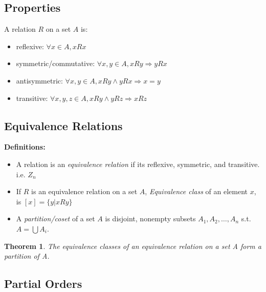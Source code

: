 \documentclass[10pt]{article}
\newcounter{set}
\newcommand{\Ra}{\Rightarrow}
\newtheorem{theorem}{Theorem}[subsection]
\begin{document}
\subsection{Properties}
A relation $R$ on a set $A$ is:
\begin{itemize}
\item reflexive: $\forall x\in A, xRx$
\item symmetric/commutative: $\forall x, y\in A, xRy \Ra yRx$
\item antisymmetric: $\forall x,y\in A, xRy \wedge yRx \Ra x=y$

\item transitive: $\forall x,y,z \in A, xRy \wedge yRz \Ra xRz$
\end{itemize}

\subsection{Equivalence Relations}
\textbf{Definitions:}
\begin{itemize}


\item A relation is an \emph{equivalence relation} if
its reflexive, symmetric, and transitive. i.e. $Z_n$

\item If $R$ is an equivalence relation on a set $A$,
  \emph{Equivalence class} of an element $x$, is $[x] = \{y|xRy\}$
\item A \emph{partition/coset} of a set $A$ is disjoint, nonempty subsets
  $A_1, A_2, \dots,  A_n$  s.t. $A = \bigcup A_i$.
\end{itemize}

\begin{theorem}
  The equivalence classes of an equivalence relation on a set A form a
  partition of A.
\end{theorem}

\subsection{Partial Orders}
\end{document}
